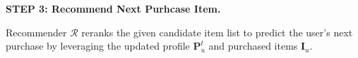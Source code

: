 

\smallskip
\noindent \textbf{STEP 3: Recommend Next Purhcase Item. }


\noindent Recommender $\mathcal{R}$ reranks the given candidate item list to predict the user's next purchase by leveraging the updated profile $\mathbf{P}_u^t$ and purchased items $\mathbf{I}_u$. 


